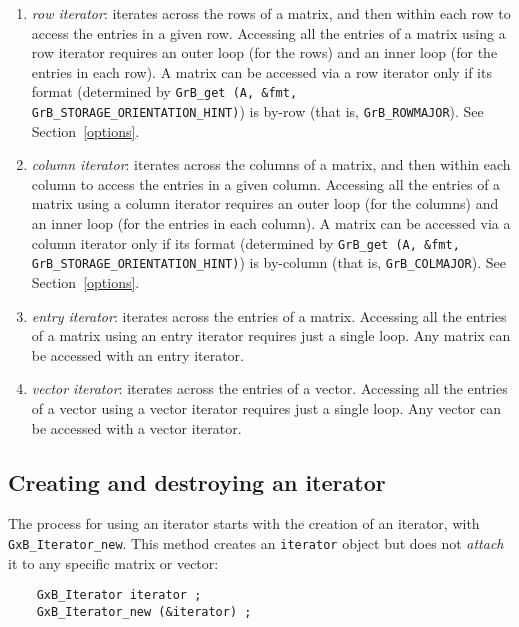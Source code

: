 \documentclass[12pt]{article}
\begin{document}
    \begin{enumerate}
    \item {\em row iterator}:  iterates across the rows of a matrix, and then
        within each row to access the entries in a given row.  Accessing all
        the entries of a matrix using a row iterator requires an outer loop
        (for the rows) and an inner loop (for the entries in each row).
        A matrix can be accessed via a row iterator only if its format
        (determined by \verb'GrB_get (A, &fmt,' \verb'GrB_STORAGE_ORIENTATION_HINT)') is by-row
        (that is, \verb'GrB_ROWMAJOR').
        See Section~\ref{options}.
    \item {\em column iterator}:  iterates across the columns of a matrix, and
        then within each column to access the entries in a given column.
        Accessing all the entries of a matrix using a column iterator requires
        an outer loop (for the columns) and an inner loop (for the entries in
        each column).  A matrix can be accessed via a column iterator only if
        its format (determined by \verb'GrB_get (A, &fmt, GrB_STORAGE_ORIENTATION_HINT)') is
        by-column (that is, \verb'GrB_COLMAJOR').
        See Section~\ref{options}.
    \item {\em entry iterator}:  iterates across the entries of a matrix.
        Accessing all the entries of a matrix using an entry iterator requires
        just a single loop.  Any matrix can be accessed with an entry iterator.
    \item {\em vector iterator}:  iterates across the entries of a vector.
        Accessing all the entries of a vector using a vector iterator requires
        just a single loop.  Any vector can be accessed with a vector iterator.
    \end{enumerate}

\subsection{Creating and destroying an iterator}

The process for using an iterator starts with the creation of an iterator, with
\verb'GxB_Iterator_new'.  This method creates an \verb'iterator' object but
does not {\em attach} it to any specific matrix or vector:

    {\footnotesize
    \begin{verbatim}
    GxB_Iterator iterator ;
    GxB_Iterator_new (&iterator) ; \end{verbatim}}
\end{document}
